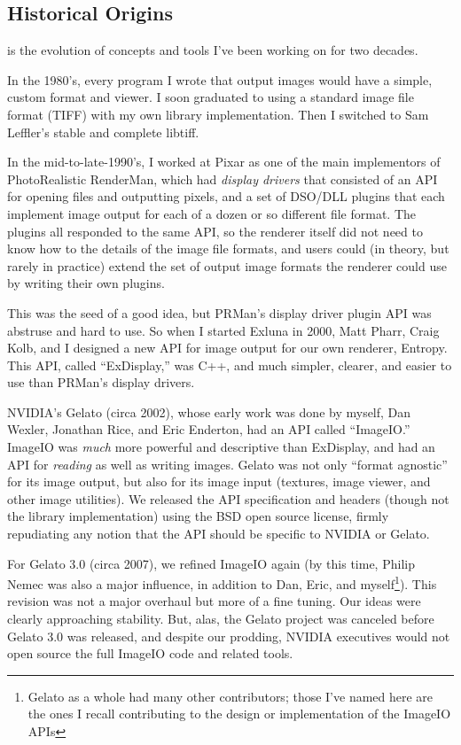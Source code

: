 \subsection*{Historical Origins}

\product is the evolution of concepts and tools I've been working on 
for two decades.

In the 1980's, every program I wrote that output images would have a
simple, custom format and viewer.  I soon graduated to using a standard
image file format (TIFF) with my own library implementation.  Then I
switched to Sam Leffler's stable and complete {\fn libtiff}.

In the mid-to-late-1990's, I worked at Pixar as one of the main
implementors of PhotoRealistic RenderMan, which had \emph{display
  drivers} that consisted of an API for opening files and outputting
pixels, and a set of DSO/DLL plugins that each implement image output
for each of a dozen or so different file format.  The plugins all
responded to the same API, so the renderer itself did not need to know
how to the details of the image file formats, and users could (in
theory, but rarely in practice) extend the set of output image formats
the renderer could use by writing their own plugins.

This was the seed of a good idea, but PRMan's display driver plugin API
was abstruse and hard to use.  So when I started Exluna in 2000, Matt
Pharr, Craig Kolb, and I designed a new API for image output for our own
renderer, Entropy.  This API, called ``ExDisplay,'' was C++, and much
simpler, clearer, and easier to use than PRMan's display drivers.

NVIDIA's Gelato (circa 2002), whose early work was done by myself, Dan
Wexler, Jonathan Rice, and Eric Enderton, had an API
called ``ImageIO.''  ImageIO was 
\emph{much} more powerful and descriptive than ExDisplay, and had an
API for \emph{reading} as well as writing images.  Gelato was not only
``format agnostic'' for its image output, but also for its
image input (textures, image viewer, and other image utilities).
We released the API specification and headers (though not the
library implementation) using the BSD open source license, firmly
repudiating any notion that the API should be specific to NVIDIA or
Gelato.

For Gelato 3.0 (circa 2007), we refined ImageIO again (by this time,
Philip Nemec was also a major influence, in addition to Dan, Eric, and
myself\footnote{Gelato as a whole had many other contributors; those
  I've named here are the ones I recall contributing to the design or
  implementation of the ImageIO APIs}).  This revision was not a major
overhaul but more of a fine tuning.  Our ideas were clearly approaching
stability.  But, alas, the Gelato project was canceled before Gelato 3.0
was released, and despite our prodding, NVIDIA executives would not open
source the full ImageIO code and related tools.

